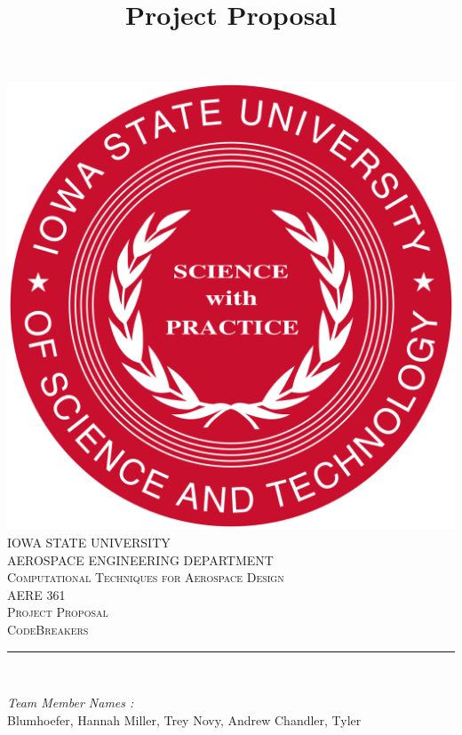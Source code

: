 \documentclass[12pt]{article}
\begin{document}
\title{Project Proposal}

\begin{titlepage}
	\centering
    \vspace*{0.5 cm}
    \includegraphics[scale = 0.11]{isu_seal.png}\\[1.0 cm]	%
    \textsc{\LARGE IOWA STATE UNIVERSITY}\\[2.0 cm]
    \textsc{\large AEROSPACE ENGINEERING DEPARTMENT}\\[0.2 cm]
    \textsc{\large Computational Techniques for Aerospace Design}\\[0.2 cm]
	\textsc{\Large AERE 361}\\[0.5 cm]				%
	\textsc{\Large Project Proposal}\\[0.2 cm]
	\textsc{\Large CodeBreakers}\\[0.2 cm]
	\rule{\linewidth}{0.2 mm} \\[0.4 cm]
	
	
	\begin{minipage}{0.8\textwidth}
		
			\begin{flushleft} 
			\emph{Team Member Names :} \\
			Blumhoefer, Hannah\linebreak
			Miller, Trey\linebreak
			Novy, Andrew\linebreak
			Chandler, Tyler\linebreak
			
			
		\end{flushleft}
	\end{minipage}\\[2 cm]
	
	\vfill
	
\end{titlepage}
\end{document}
